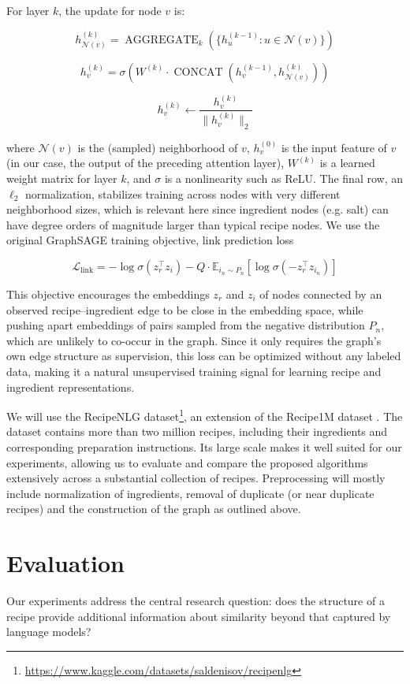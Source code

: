 \documentclass{article}
\begin{document}
For layer $k$, the update for node $v$ is:

$$h_{\mathcal{N}(v)}^{(k)} = \operatorname{AGGREGATE}_k\left(\{h_u^{(k-1)} : u \in \mathcal{N}(v)\}\right)$$

$$h_v^{(k)} = \sigma\left(W^{(k)} \cdot \operatorname{CONCAT}\left(h_v^{(k-1)}, h_{\mathcal{N}(v)}^{(k)}\right)\right)$$

$$h_v^{(k)} \leftarrow \frac{h_v^{(k)}}{\|h_v^{(k)}\|_2}$$

where $\mathcal{N}(v)$ is the (sampled) neighborhood of $v$, $h_v^{(0)}$ is the input feature of $v$ (in our case, the output of the preceding attention layer), $W^{(k)}$ is a learned weight matrix for layer $k$, and $\sigma$ is a nonlinearity such as ReLU. The final row, an $\ell_2$ normalization, stabilizes training across nodes with very different neighborhood sizes, which is relevant here since ingredient nodes (e.g. salt) can have degree orders of magnitude larger than typical recipe nodes. We use the original GraphSAGE training objective, link prediction loss

$$\mathcal{L}_{\text{link}} = -\log\sigma\left(z_r^\top z_i\right) - Q \cdot \mathbb{E}_{i_n \sim P_n}\left[\log\sigma\left(-z_r^\top z_{i_n}\right)\right]$$

This objective encourages the embeddings $z_r$ and $z_i$ of nodes connected by an observed recipe–ingredient edge to be close in the embedding space, while pushing apart embeddings of pairs sampled from the negative distribution $P_n$, which are unlikely to co-occur in the graph. Since it only requires the graph's own edge structure as supervision, this loss can be optimized without any labeled data, making it a natural unsupervised training signal for learning recipe and ingredient representations.

We will use the RecipeNLG dataset\footnote{\url{https://www.kaggle.com/datasets/saldenisov/recipenlg}}, an extension of the Recipe1M dataset \cite{marin2019learning,salvador2017learning}. The dataset contains more than two million recipes, including their ingredients and corresponding preparation instructions. Its large scale makes it well suited for our experiments, allowing us to evaluate and compare the proposed algorithms extensively across a substantial collection of recipes. Preprocessing will mostly include normalization of ingredients, removal of duplicate (or near duplicate recipes) and the construction of the graph as outlined above.

\section{Evaluation}
Our experiments address the central research question: does the structure of a recipe provide additional information about similarity beyond that captured by language models?
\end{document}

